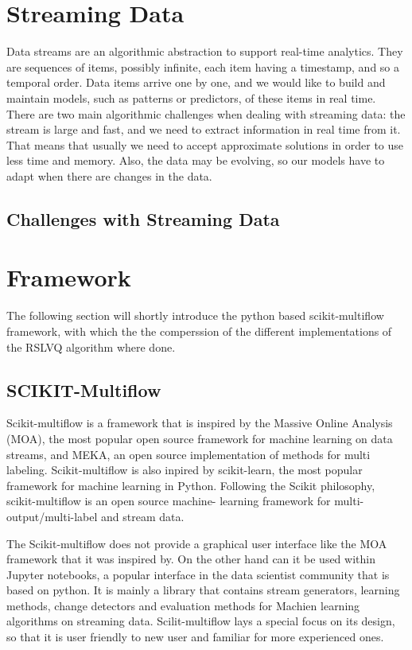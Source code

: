 \documentclass[12pt,oneside,a4paper,parskip]{scrbook}
\begin{document}
\pagebreak

\section{Streaming Data}

Data streams are an algorithmic abstraction to support real-time analytics. They are sequences of items, 
possibly infinite, each item having a timestamp, and so a temporal order. Data items arrive one by one, 
and we would like to build and maintain models, such as patterns or predictors, of these items in real time. 
There are two main algorithmic challenges when dealing with streaming data: the stream is large and fast, 
and we need to extract information in real time from it. That means that usually we need to accept approximate 
solutions in order to use less time and memory.
Also, the data may be evolving, so our models have to adapt when there are changes in the data. \cite{MLonDataStreams}

\subsection{Challenges with Streaming Data}

\cite{ConceptDrift}

\section{Framework}
The following section will shortly introduce the python based scikit-multiflow framework, with which the the comperssion 
of the different implementations of the RSLVQ algorithm where done.

\subsection{SCIKIT-Multiflow}
Scikit-multiflow is a framework that is inspired by the Massive Online Analysis (MOA), the most popular open source framework for machine learning on data streams,
and MEKA, an open source implementation of methods for multi labeling. Scikit-multiflow is also inpired by scikit-learn, the most 
popular framework for machine learning in Python. Following the Scikit philosophy, scikit-multiflow is an open source machine-
learning framework for multi-output/multi-label and stream data. 

The Scikit-multiflow does not provide a graphical user interface like the MOA framework that it was inspired by. 
On the other hand can it be used within Jupyter notebooks, a popular interface in the data scientist community that is based 
on python. 
It is mainly a library that contains stream generators, learning methods, change detectors and evaluation methods for 
Machien learning algorithms on streaming data. 
Scilit-multiflow lays a special focus on its design, so that it is user friendly to new user and familiar for more 
experienced ones.\cite{skmultiflow}
\end{document}
